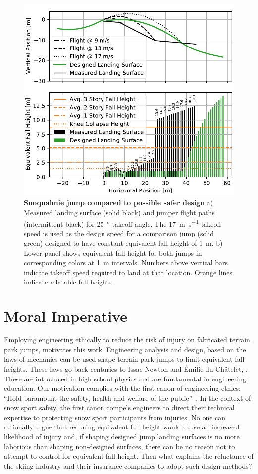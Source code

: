 \documentclass{article}
\begin{document}
\begin{figure}
  \centering
  \includegraphics[width=5.25in]{figures/salvini-v-snoqualmie.pdf}
  \caption{\textbf{Snoqualmie jump compared to possible safer design}
  a) Measured landing surface (solid black) and jumper flight paths (intermittent
  black) for 25~\si{\degree} takeoff angle. The
  17~\si{\meter\per\second} takeoff speed is used as the design speed for a comparison
  jump (solid green) designed to have constant equivalent fall height of 1~\si{\meter}.
  b) Lower panel shows equivalent fall height for both jumps
  in corresponding colors at 1~\si{\meter} intervals. Numbers above
  vertical bars indicate takeoff speed required
  to land at that location. Orange lines indicate relatable fall heights.}
  \label{fig:salvini-v-snoqualmie}
\end{figure}

\section{Moral Imperative}
%
Employing engineering ethically to reduce the risk of injury on fabricated
terrain park jumps, motivates this work. Engineering analysis and design, based
on the laws of mechanics can be used shape terrain park jumps to limit
equivalent fall heights. These laws go back centuries to Issac Newton and
Émilie du Châtelet, \cite{Zinsser2007}. These are introduced in high school physics and
are fundamental in engineering education. Our motivation complies with the
first canon of engineering ethics: ``Hold paramount the safety, health and
welfare of the public''~\cite{NSPE2019}. In the context of snow sport safety,
the first canon compels engineers to direct their technical expertise to
protecting snow sport participants from injuries. No one can rationally argue
that reducing equivalent fall height would cause an increased likelihood of
injury and, if shaping designed jump landing surfaces is no more laborious than
shaping non-designed surfaces, there can be no reason not to attempt to control
for equivalent fall height. Then what explains the reluctance of the skiing
industry and their insurance companies to adopt such design methods?
\end{document}
